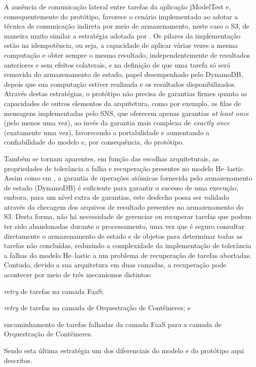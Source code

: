 \documentclass[english,brazilian]{UNISINOSmonografia} %
\begin{document}
A ausência de comunicação lateral entre tarefas da aplicação jModelTest e, consequentemente do protótipo, favorece o cenário implementado ao adotar a técnica de comunicação indireta por meio de armazenamento, neste caso o S3, de maneira muito similar a estratégia adotada por .
%
Os pilares da implementação estão na idempotência, ou seja, a capacidade de aplicar várias vezes a mesma computação e obter sempre o mesmo resultado, independentemente de resultados anteriores e sem efeitos colaterais, 
e na definição de que uma tarefa só será removida do armazenamento de estado, papel desempenhado pelo DynamoDB, depois que sua computação estiver realizada e os resultados disponibilizados.
%
Através destas estratégias, o protótipo não precisa de garantias firmes quanto as capacidades de outros elementos da arquitetura, como por exemplo, as filas de mensagens implementadas pelo SNS, que oferecem apenas garantias \textit{at least once} (pelo menos uma vez), ao invés da garantia mais complexa de \textit{exactly once} (exatamente uma vez), favorecendo a portabilidade e aumentando a confiabilidade do modelo e, por consequência, do protótipo.



Também se tornam aparentes, em função das escolhas arquiteturais, as propriedades de tolerância a falha e recuperação presentes no modelo \textsf{He}--lastic.
%
Assim como em , a garantia de operações atômicas fornecida pelo armazenamento de estado (DynamoDB) é suficiente para garantir o sucesso de uma execução, embora, para um nível extra de garantias, este desfecho possa ser validado através da checagem dos arquivos de resultado presentes no armazenamento do S3.
%
Desta forma, não há necessidade de gerenciar ou recuperar tarefas que podem ter sido abandonadas durante o processamento, uma vez que é seguro consultar diretamente o armazenamento de estado e de objetos para determinar todas as tarefas não concluídas, reduzindo a complexidade da implementação de tolerância a falhas do modelo \textsf{He}--lastic a um problema de recuperação de tarefas abortadas.
%
Contudo, devido a sua arquitetura em duas camadas, a recuperação pode acontecer por meio de três mecanismos distintos: 
\begin{inparaenum} 
	\item \textit{retry} de tarefas na camada FaaS;
	\item \textit{retry} de tarefas na camada de Orquestração de Contêineres; e
	\item encaminhamento de tarefas falhadas da camada FaaS para a camada de Orquestração de Contêineres.
\end{inparaenum}
Sendo esta última estratégia um dos diferenciais do modelo e do protótipo aqui descritos.
\end{document}
